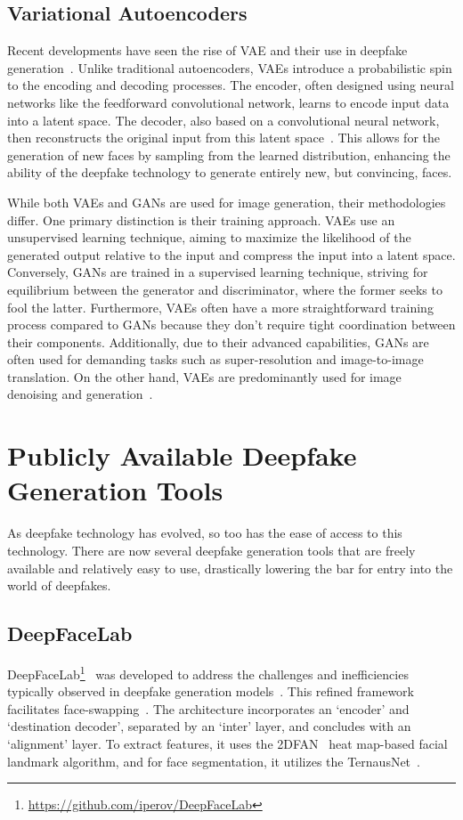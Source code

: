 \subsection{Variational Autoencoders}
Recent developments have seen the rise of \ac{VAE} and their use in deepfake
generation~\cite{kingma2022autoencoding}. Unlike traditional autoencoders, \ac{VAE}s introduce
a probabilistic spin to the encoding and decoding processes. The encoder, often
designed using neural networks like the feedforward convolutional network,
learns to encode input data into a latent space. The decoder, also based
on a convolutional neural network, then reconstructs the original input
from this latent space~\cite{vae-gan}. This allows for the
generation of new faces by sampling from the learned distribution, enhancing the
ability of the deepfake technology to generate entirely new, but convincing, faces.

While both \ac{VAE}s and \ac{GAN}s are used for image generation, their methodologies differ.
One primary distinction is their training approach. \ac{VAE}s use an unsupervised learning
technique, aiming to maximize the likelihood of the generated output relative to the
input and compress the input into a latent space. Conversely, \ac{GAN}s are trained
in a supervised learning technique, striving for equilibrium between the generator
and discriminator, where the former seeks to fool the latter. Furthermore, \ac{VAE}s
often have a more straightforward training process compared to \ac{GAN}s because they
don't require tight coordination between their components. Additionally, due to their
advanced capabilities, \ac{GAN}s are often used for demanding tasks such as
super-resolution and image-to-image translation. On the other hand, \ac{VAE}s are
predominantly used for image denoising and generation~\cite{vae-gan}.

\section{Publicly Available Deepfake Generation Tools}\label{chapter:publicly}
As deepfake technology has evolved, so too has the ease of access to this technology.
There are now several deepfake generation tools that are freely available and relatively
easy to use, drastically lowering the bar for entry into the world of deepfakes.

\subsection{DeepFaceLab}\label{sec:deepfacelab}
DeepFaceLab\footnote{\url{https://github.com/iperov/DeepFaceLab}}~\cite{perov2021deepfacelab,10.1117/12.2631297}
was developed to address the challenges and inefficiencies typically
observed in deepfake generation models~\cite{s22124556}. This refined framework
facilitates face-swapping~\cite{perov2021deepfacelab}. The architecture incorporates
an `encoder' and `destination decoder', separated by an `inter' layer, and
concludes with an `alignment' layer. To extract features, it uses the 2DFAN~\cite{Bulat_2017}
heat map-based facial landmark algorithm, and for face segmentation,
it utilizes the TernausNet~\cite{iglovikov2018ternausnet}.


